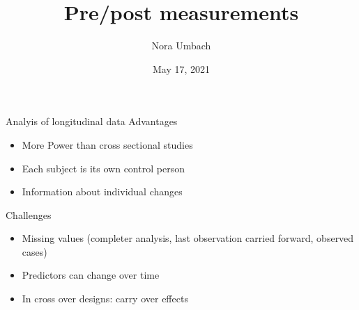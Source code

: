 \documentclass{beamer}
\title{Pre/post measurements}
\author{Nora Umbach%
}
\date{May 17, 2021}
\newcommand{\vect}[1]{\mathbf{#1}}
\begin{document}
\begin{frame}{}
\thispagestyle{empty}
\titlepage
\end{frame}



\begin{frame}{Analyis of longitudinal data}
Advantages

\begin{itemize}
\item More Power than cross sectional studies
\item Each subject is its own control person
\item Information about individual changes
\end{itemize}

Challenges
\begin{itemize}
\item Missing values (completer analysis, last observation carried forward,
  observed cases)
\item Predictors can change over time
\item In cross over designs: carry over effects
\end{itemize}
\end{frame}


% 
% 
% 
\end{document}
